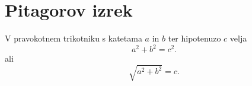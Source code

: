 \documentclass{article}
\begin{document}
\section*{Pitagorov izrek}
V pravokotnem trikotniku s katetama \(a\) in \(b\) ter hipotenuzo \(c\) velja
\[ a^2 + b^2 = c^2 .\] 
    ali
\[\sqrt{a^2 + b^2} = c.\]
\end{document}
